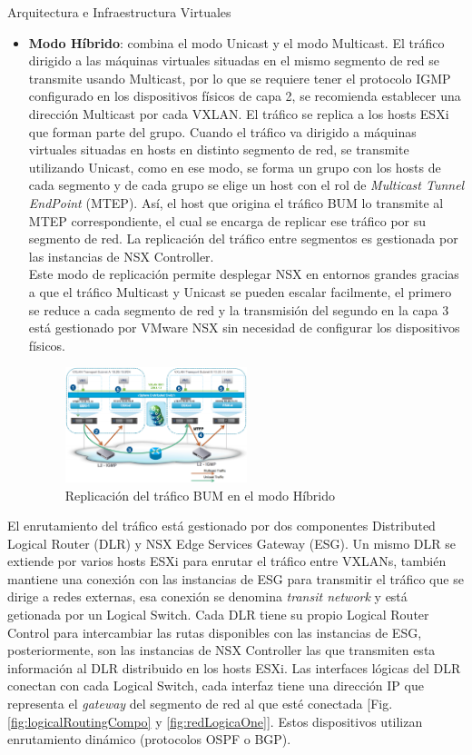 \begin{subsection}{Arquitectura e Infraestructura Virtuales\cite{CFVirtInfraes}}
\begin{itemize}
    \FloatBarrier
        \item \textbf{Modo Híbrido}: combina el modo Unicast y el modo Multicast. El tráfico dirigido a las máquinas virtuales situadas en el mismo segmento de red se transmite usando Multicast, por lo que se requiere tener el protocolo IGMP configurado en los dispositivos físicos de capa 2, se recomienda establecer una dirección Multicast por cada VXLAN. El tráfico se replica a los hosts ESXi que forman parte del grupo. Cuando el tráfico va dirigido a máquinas virtuales situadas en hosts en distinto segmento de red, se transmite utilizando Unicast, como en ese modo, se forma un grupo con los hosts de cada segmento y de cada grupo se elige un host con el rol de \textit{Multicast Tunnel EndPoint} (MTEP). Así, el host que origina el tráfico BUM lo transmite al MTEP correspondiente, el cual se encarga de replicar ese tráfico por su segmento de red. La replicación del tráfico entre segmentos es gestionada por las instancias de NSX Controller.\\
        Este modo de replicación permite desplegar NSX en entornos grandes gracias a que el tráfico Multicast y Unicast se pueden escalar facilmente, el primero se reduce a cada segmento de red y la transmisión del segundo en la capa 3 está gestionado por VMware NSX sin necesidad de configurar los dispositivos físicos.
    \begin{figure}[h!]
        \centering
        \includegraphics[width=0.5\textwidth]{imaxes/conceptosPrevios/hibrydMode.png}
        \caption{Replicación del tráfico BUM en el modo Híbrido}
        \label{fig:modoHibrido}
    \end{figure}
    \FloatBarrier
    \end{itemize}

 El enrutamiento del tráfico está gestionado por dos componentes Distributed Logical Router (DLR) y NSX Edge Services Gateway (ESG). Un mismo DLR se extiende por varios hosts ESXi para enrutar el tráfico entre VXLANs, también mantiene una conexión con las instancias de ESG para transmitir el tráfico que se dirige a redes externas, esa conexión se denomina \textit{transit network} y está getionada por un Logical Switch. Cada DLR tiene su propio Logical Router Control para intercambiar las rutas disponibles con las instancias de ESG, posteriormente, son las instancias de NSX Controller las que transmiten esta información al DLR distribuido en los hosts ESXi. Las interfaces lógicas del DLR conectan con cada Logical Switch, cada interfaz tiene una dirección IP que representa el \textit{gateway} del segmento de red al que esté conectada [Fig. \ref{fig:logicalRoutingCompo} y \ref{fig:redLogicaOne}]. Estos dispositivos utilizan enrutamiento dinámico (protocolos OSPF o BGP).
 

\end{subsection}
